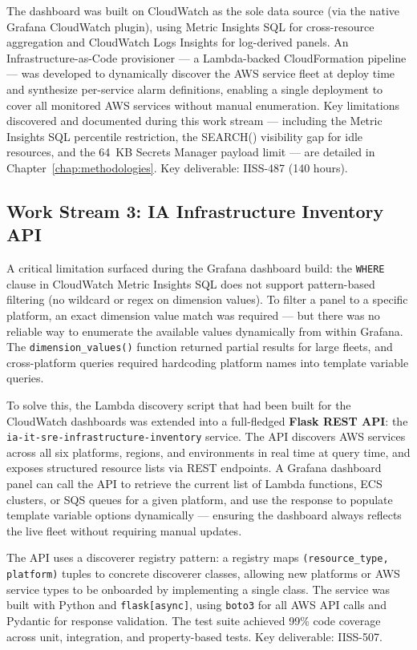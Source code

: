 The dashboard was built on CloudWatch as the sole data source (via the native
Grafana CloudWatch plugin), using Metric Insights SQL for cross-resource
aggregation and CloudWatch Logs Insights for log-derived panels. An
Infrastructure-as-Code provisioner --- a Lambda-backed CloudFormation pipeline
--- was developed to dynamically discover the AWS service fleet at deploy time
and synthesize per-service alarm definitions, enabling a single deployment to
cover all monitored AWS services without manual enumeration. Key limitations
discovered and documented during this work stream --- including the Metric
Insights SQL percentile restriction, the SEARCH() visibility gap for idle
resources, and the 64~KB Secrets Manager payload limit --- are detailed in
Chapter~\ref{chap:methodologies}. Key deliverable: IISS-487 (140 hours).

\subsection{Work Stream 3: IA Infrastructure Inventory API}

A critical limitation surfaced during the Grafana dashboard build: the
\texttt{WHERE} clause in CloudWatch Metric Insights SQL does not support
pattern-based filtering (no wildcard or regex on dimension values). To filter
a panel to a specific platform, an exact dimension value match was required ---
but there was no reliable way to enumerate the available values dynamically from
within Grafana. The \texttt{dimension\_values()} function returned partial
results for large fleets, and cross-platform queries required hardcoding platform
names into template variable queries.

To solve this, the Lambda discovery script that had been built for the
CloudWatch dashboards was extended into a full-fledged \textbf{Flask REST API}:
the \texttt{ia-it-sre-infrastructure-inventory} service. The API discovers AWS
services across all six platforms, regions, and environments in real time at
query time, and exposes structured resource lists via REST endpoints. A Grafana
dashboard panel can call the API to retrieve the current list of Lambda
functions, ECS clusters, or SQS queues for a given platform, and use the
response to populate template variable options dynamically --- ensuring the
dashboard always reflects the live fleet without requiring manual updates.

The API uses a discoverer registry pattern: a registry maps
\texttt{(resource\_type, platform)} tuples to concrete discoverer classes,
allowing new platforms or AWS service types to be onboarded by implementing
a single class. The service was built with Python and \texttt{flask[async]},
using \texttt{boto3} for all AWS API calls and Pydantic for response validation.
The test suite achieved 99\% code coverage across unit, integration, and
property-based tests. Key deliverable: IISS-507.

